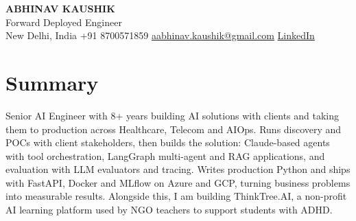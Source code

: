 \documentclass[10pt,a4paper]{article}
\begin{document}
\begin{center}
  {\LARGE\bfseries ABHINAV KAUSHIK}\\[2pt]
  {\large Forward Deployed Engineer}\\[2pt]
  New Delhi, India \textbar{} +91 8700571859 \textbar{} \href{mailto:aabhinav.kaushik@gmail.com}{aabhinav.kaushik@gmail.com} \textbar{} \href{https://www.linkedin.com/in/abhinav-kaushik10/}{LinkedIn}  
\end{center}

\section{Summary}
Senior AI Engineer with 8+ years building AI solutions with clients and taking them to production across Healthcare, Telecom and AIOps. Runs discovery and POCs with client stakeholders, then builds the solution: Claude-based agents with tool orchestration, LangGraph multi-agent and RAG applications, and evaluation with LLM evaluators and tracing. Writes production Python and ships with FastAPI, Docker and MLflow on Azure and GCP, turning business problems into measurable results. Alongside this, I am building ThinkTree.AI, a non-profit AI learning platform used by NGO teachers to support students with ADHD.
\end{document}

